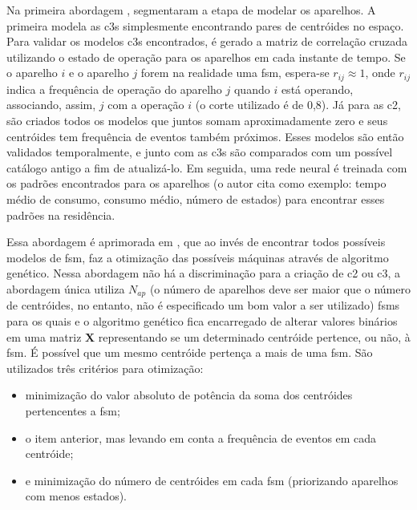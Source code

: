 \begin{enumerate}[label=\textbf{1.\arabic*},wide=\parindent]
\begin{enumerate}[label*=.\textbf{\arabic*},wide=\parindent]
\begin{itemize}[wide=\parindent]
Na primeira abordagem \cite{nilm_baranski_genetic_base_2003_19},
\citeauthor*{nilm_baranski_genetic_base_2003_19} segmentaram a etapa
de modelar os aparelhos. A primeira modela as \glspl{c3} simplesmente
encontrando pares de centróides no espaço. Para validar os modelos
\glspl{c3} encontrados, é gerado a matriz de correlação cruzada
utilizando o estado de operação para os aparelhos em cada instante de
tempo. Se o aparelho $i$ e o aparelho $j$ forem na realidade uma
\gls{fsm}, espera-se $r_{ij}\approx1$, onde $r_{ij}$ indica a
frequência de operação do aparelho $j$ quando $i$ está operando,
associando, assim, $j$ com a operação $i$ (o corte utilizado é de
0,8). Já para as \gls{c2}, são criados todos os modelos que
juntos somam aproximadamente zero e seus centróides tem frequência de
eventos também próximos. Esses modelos são então validados
temporalmente, e junto com as \glspl{c3} são comparados com um
possível catálogo antigo a fim de atualizá-lo. Em seguida, uma rede
neural é treinada com os padrões encontrados para os aparelhos (o
autor cita como exemplo: tempo médio de consumo, consumo médio, número
de estados) para encontrar esses padrões na residência.

Essa abordagem é aprimorada em
\cite{nilm_baranski_genetic_detalhado_2004_20,nilm_baranski_summary_2004_21},
que ao invés de encontrar todos possíveis modelos de \gls{fsm},
faz a otimização das possíveis máquinas através de algoritmo genético.
Nessa abordagem não há a discriminação para a criação de \gls{c2} ou
\gls{c3}, a abordagem única utiliza $N_{ap}$ (o número de aparelhos
deve ser maior que o número de centróides, no entanto, não é
especificado um bom valor a ser utilizado) \glspl{fsm} para os quais e o
algoritmo genético fica encarregado de alterar valores binários em uma
matriz $\mathbf{X}$ representando se um determinado centróide
pertence, ou não, à \gls{fsm}. É possível que um mesmo centróide
pertença a mais de uma \gls{fsm}. São utilizados três critérios para
otimização: 

\begin{itemize}
\item minimização do valor absoluto de potência da soma dos
centróides pertencentes a \gls{fsm}; 
\item o item anterior, mas levando em conta a frequência de
eventos em cada centróide; 
\item e minimização do número de centróides em
cada \gls{fsm} (priorizando aparelhos com menos estados).
\end{itemize}


\end{itemize}
\end{enumerate}
\end{enumerate}
